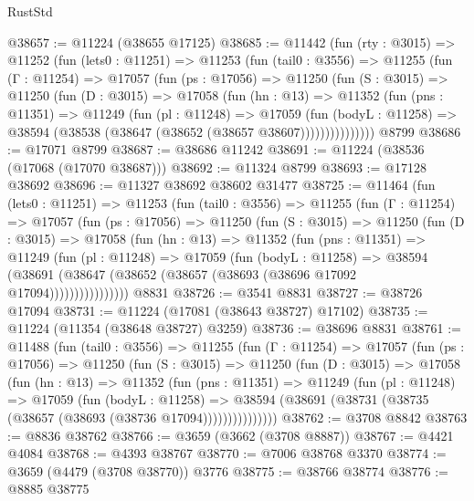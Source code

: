 \begin{lexlean}{RustStd}
\begin{coremodule}
@38657 := @11224 (@38655 @17125)
@38685 := @11442
    (fun (rty : @3015) =>
    @11252
      (fun (lets0 : @11251) =>
      @11253
        (fun (tail0 : @3556) =>
        @11255
          (fun (Γ : @11254) =>
          @17057
            (fun (ps : @17056) =>
            @11250
              (fun (S : @3015) =>
              @11250
                (fun (D : @3015) =>
                @17058
                  (fun (hn : @13) =>
                  @11352
                    (fun (pns : @11351) =>
                    @11249
                      (fun (pl : @11248) =>
                      @17059
                        (fun (bodyL : @11258) =>
                        @38594 (@38538 (@38647 (@38652 (@38657 @38607)))))))))))))))
    @8799
@38686 := @17071 @8799
@38687 := @38686 @11242
@38691 := @11224 (@38536 (@17068 (@17070 @38687)))
@38692 := @11324 @8799
@38693 := @17128 @38692
@38696 := @11327 @38692 @38602 @31477
@38725 := @11464
    (fun (lets0 : @11251) =>
    @11253
      (fun (tail0 : @3556) =>
      @11255
        (fun (Γ : @11254) =>
        @17057
          (fun (ps : @17056) =>
          @11250
            (fun (S : @3015) =>
            @11250
              (fun (D : @3015) =>
              @17058
                (fun (hn : @13) =>
                @11352
                  (fun (pns : @11351) =>
                  @11249
                    (fun (pl : @11248) =>
                    @17059
                      (fun (bodyL : @11258) =>
                      @38594
                        (@38691
                          (@38647 (@38652 (@38657 (@38693 (@38696 @17092 @17094))))))))))))))))
    @8831
@38726 := @3541 @8831
@38727 := @38726 @17094
@38731 := @11224 (@17081 (@38643 @38727) @17102)
@38735 := @11224 (@11354 (@38648 @38727) @3259)
@38736 := @38696 @8831
@38761 := @11488
    (fun (tail0 : @3556) =>
    @11255
      (fun (Γ : @11254) =>
      @17057
        (fun (ps : @17056) =>
        @11250
          (fun (S : @3015) =>
          @11250
            (fun (D : @3015) =>
            @17058
              (fun (hn : @13) =>
              @11352
                (fun (pns : @11351) =>
                @11249
                  (fun (pl : @11248) =>
                  @17059
                    (fun (bodyL : @11258) =>
                    @38594 (@38691 (@38731 (@38735 (@38657 (@38693 (@38736 @17094)))))))))))))))
@38762 := @3708 @8842
@38763 := @8836 @38762
@38766 := @3659 (@3662 (@3708 @8887))
@38767 := @4421 @4084
@38768 := @4393 @38767
@38770 := @7006 @38768 @3370
@38774 := @3659 (@4479 (@3708 @38770)) @3776
@38775 := @38766 @38774
@38776 := @8885 @38775

\end{coremodule}
\end{lexlean}
